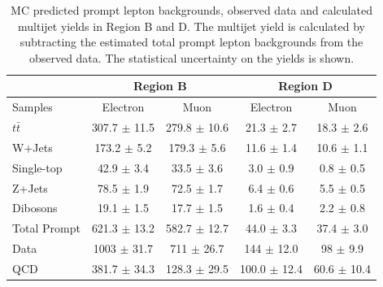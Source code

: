 \begin{table}
\begin{center}
\begin{tabular}{l|c|c||c|c}
             &\multicolumn{2}{c||}{Region B}                &\multicolumn{2}{c}{Region D} \\
\hline
Samples       & Electron               & Muon                & Electron          & Muon \\      
\hline
$t\bar{t}$    &  307.7 $\pm$ 11.5      & 279.8 $\pm$ 10.6    & 21.3 $\pm$ 2.7    & 18.3  $\pm$ 2.6  \\
W+Jets        &  173.2 $\pm$ 5.2       & 179.3 $\pm$ 5.6     & 11.6 $\pm$ 1.4    & 10.6  $\pm$ 1.1  \\        
Single-top    &  42.9  $\pm$ 3.4       & 33.5  $\pm$ 3.6     &  3.0 $\pm$ 0.9    &  0.8  $\pm$ 0.5  \\
Z+Jets        &  78.5  $\pm$ 1.9       & 72.5  $\pm$ 1.7     &  6.4 $\pm$ 0.6    &  5.5  $\pm$ 0.5  \\
Dibosons      &  19.1  $\pm$ 1.5       & 17.7  $\pm$ 1.5     &  1.6 $\pm$ 0.4    &  2.2  $\pm$ 0.8  \\
\hline
Total Prompt  &  621.3 $\pm$ 13.2      & 582.7 $\pm$ 12.7    & 44.0 $\pm$ 3.3    & 37.4  $\pm$ 3.0  \\
\hline
Data          &  1003  $\pm$ 31.7      & 711   $\pm$ 26.7    & 144  $\pm$ 12.0   & 98    $\pm$ 9.9  \\
\hline
QCD           & 381.7 $\pm$ 34.3       & 128.3 $\pm$ 29.5    & 100.0 $\pm$ 12.4  & 60.6 $\pm$ 10.4 \\
\end{tabular}
\end{center}
\caption[MC predicted prompt lepton backgrounds, observed data and calculated multijet yields
in Region B and D]{MC predicted prompt lepton backgrounds, observed data and calculated multijet yields
in Region B and D. The multijet yield is calculated by subtracting the estimated total prompt lepton
backgrounds from the observed data. The statistical uncertainty on the yields is shown.}
\label{tab:boosted_region_bd_promptbkgd_data}
\end{table}
 
